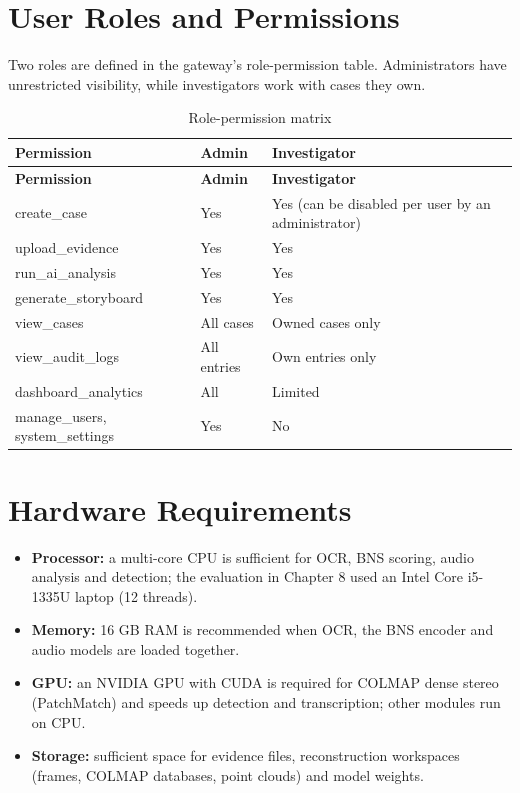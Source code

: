 \documentclass[12pt,a4paper,oneside]{report}
\begin{document}
\section{User Roles and Permissions}
Two roles are defined in the gateway's role-permission table. Administrators have unrestricted visibility, while investigators work with cases they own.

{\small
\setlength{\tabcolsep}{3pt}
\renewcommand{\arraystretch}{1.15}
\begin{longtable}{|>{\raggedright\arraybackslash}p{4.73cm}|>{\raggedright\arraybackslash}p{2.84cm}|>{\raggedright\arraybackslash}p{6.63cm}|}
\caption{Role-permission matrix}\\
\hline
\rowcolor{headfill}\textbf{Permission} & \textbf{Admin} & \textbf{Investigator} \\ \hline
\endfirsthead
\hline
\rowcolor{headfill}\textbf{Permission} & \textbf{Admin} & \textbf{Investigator} \\ \hline
\endhead
\hline \endfoot
create\_case & Yes & Yes (can be disabled per user by an administrator) \\ \hline
upload\_evidence & Yes & Yes \\ \hline
run\_ai\_analysis & Yes & Yes \\ \hline
generate\_storyboard & Yes & Yes \\ \hline
view\_cases & All cases & Owned cases only \\ \hline
view\_audit\_logs & All entries & Own entries only \\ \hline
dashboard\_analytics & All & Limited \\ \hline
manage\_users, system\_settings & Yes & No \\ \hline
\end{longtable}
}

\section{Hardware Requirements}
\begin{itemize}
  \item \textbf{Processor:} a multi-core CPU is sufficient for OCR, BNS scoring, audio analysis and detection; the evaluation in Chapter 8 used an Intel Core i5-1335U laptop (12 threads).
  \item \textbf{Memory:} 16 GB RAM is recommended when OCR, the BNS encoder and audio models are loaded together.
  \item \textbf{GPU:} an NVIDIA GPU with CUDA is required for COLMAP dense stereo (PatchMatch) and speeds up detection and transcription; other modules run on CPU.
  \item \textbf{Storage:} sufficient space for evidence files, reconstruction workspaces (frames, COLMAP databases, point clouds) and model weights.
\end{itemize}
\end{document}
